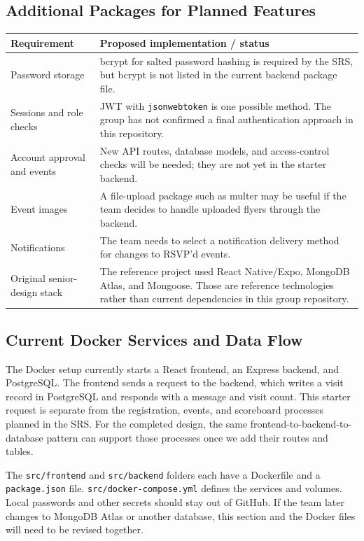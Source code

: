 \subsection{Additional Packages for Planned Features}
\begin{longtable}{L{0.28\textwidth}L{0.62\textwidth}}
\toprule Requirement & Proposed implementation / status \\ \midrule
Password storage & bcrypt for salted password hashing is required by the SRS, but bcrypt is not listed in the current backend package file. \\
Sessions and role checks & JWT with \texttt{jsonwebtoken} is one possible method. The group has not confirmed a final authentication approach in this repository. \\
Account approval and events & New API routes, database models, and access-control checks will be needed; they are not yet in the starter backend. \\
Event images & A file-upload package such as multer may be useful if the team decides to handle uploaded flyers through the backend. \\
Notifications & The team needs to select a notification delivery method for changes to RSVP'd events. \\
Original senior-design stack & The reference project used React Native/Expo, MongoDB Atlas, and Mongoose. Those are reference technologies rather than current dependencies in this group repository. \\
\bottomrule
\end{longtable}

\subsection{Current Docker Services and Data Flow}
The Docker setup currently starts a React frontend, an Express backend, and PostgreSQL. The frontend sends a request to the backend, which writes a visit record in PostgreSQL and responds with a message and visit count. This starter request is separate from the registration, events, and scoreboard processes planned in the SRS. For the completed design, the same frontend-to-backend-to-database pattern can support those processes once we add their routes and tables.

The \texttt{src/frontend} and \texttt{src/backend} folders each have a Dockerfile and a \texttt{package.json} file. \texttt{src/docker-compose.yml} defines the services and volumes. Local passwords and other secrets should stay out of GitHub. If the team later changes to MongoDB Atlas or another database, this section and the Docker files will need to be revised together.

